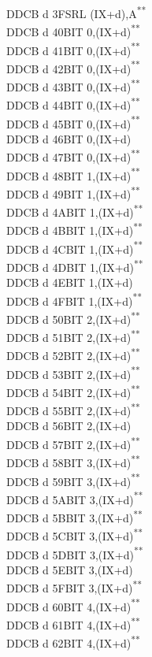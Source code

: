 \documentclass[twoside,openright,a4paper]{book}
\newcommand{\UNDOC}{\textnormal{\textsuperscript{**}}}
\begin{document}
\begin{multicols}{3}
{\begin{tabbing}
	DDCB d 3F\>SRL (IX+d),A\UNDOC\\
	DDCB d 40\>BIT 0,(IX+d)\UNDOC\\
	DDCB d 41\>BIT 0,(IX+d)\UNDOC\\
	DDCB d 42\>BIT 0,(IX+d)\UNDOC\\
	DDCB d 43\>BIT 0,(IX+d)\UNDOC\\
	DDCB d 44\>BIT 0,(IX+d)\UNDOC\\
	DDCB d 45\>BIT 0,(IX+d)\UNDOC\\
	DDCB d 46\>BIT 0,(IX+d)\\
	DDCB d 47\>BIT 0,(IX+d)\UNDOC\\
	DDCB d 48\>BIT 1,(IX+d)\UNDOC\\
	DDCB d 49\>BIT 1,(IX+d)\UNDOC\\
	DDCB d 4A\>BIT 1,(IX+d)\UNDOC\\
	DDCB d 4B\>BIT 1,(IX+d)\UNDOC\\
	DDCB d 4C\>BIT 1,(IX+d)\UNDOC\\
	DDCB d 4D\>BIT 1,(IX+d)\UNDOC\\
	DDCB d 4E\>BIT 1,(IX+d)\\
	DDCB d 4F\>BIT 1,(IX+d)\UNDOC\\
	DDCB d 50\>BIT 2,(IX+d)\UNDOC\\
	DDCB d 51\>BIT 2,(IX+d)\UNDOC\\
	DDCB d 52\>BIT 2,(IX+d)\UNDOC\\
	DDCB d 53\>BIT 2,(IX+d)\UNDOC\\
	DDCB d 54\>BIT 2,(IX+d)\UNDOC\\
	DDCB d 55\>BIT 2,(IX+d)\UNDOC\\
	DDCB d 56\>BIT 2,(IX+d)\\
	DDCB d 57\>BIT 2,(IX+d)\UNDOC\\
	DDCB d 58\>BIT 3,(IX+d)\UNDOC\\
	DDCB d 59\>BIT 3,(IX+d)\UNDOC\\
	DDCB d 5A\>BIT 3,(IX+d)\UNDOC\\
	DDCB d 5B\>BIT 3,(IX+d)\UNDOC\\
	DDCB d 5C\>BIT 3,(IX+d)\UNDOC\\
	DDCB d 5D\>BIT 3,(IX+d)\UNDOC\\
	DDCB d 5E\>BIT 3,(IX+d)\\
	DDCB d 5F\>BIT 3,(IX+d)\UNDOC\\
	DDCB d 60\>BIT 4,(IX+d)\UNDOC\\
	DDCB d 61\>BIT 4,(IX+d)\UNDOC\\
	DDCB d 62\>BIT 4,(IX+d)\UNDOC\\

\end{tabbing}}
\end{multicols}
\end{document}
